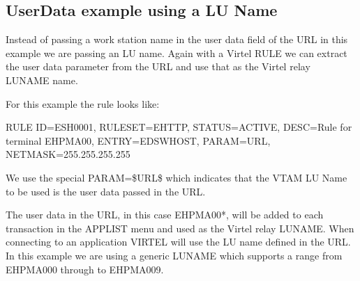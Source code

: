 \documentclass[letterpaper,10pt,english]{sphinxmanual}
\begin{document}
\ignorespaces 

\subsection{UserData example using a LU Name}
\label{\detokenize{connectivity_guide:userdata-example-using-a-lu-name}}\label{\detokenize{connectivity_guide:index-154}}
\sphinxAtStartPar
Instead of passing a work station name in the user data field of the URL in this example we are passing an LU name. Again with a Virtel RULE we can extract the user data parameter from the URL and use that as the Virtel relay LUNAME name.

\sphinxAtStartPar
{}

\sphinxAtStartPar
For this example the rule looks like:\sphinxhyphen{}

\begin{sphinxVerbatim}[commandchars=\\\{\}]
RULE ID=ESH0001,
RULESET=E\PYGZhy{}HTTP,
STATUS=ACTIVE,
DESC=\PYGZsq{}Rule for terminal EHPMA00\PYGZsq{},
ENTRY=EDSWHOST,
PARAM=\PYGZdl{}URL\PYGZdl{},
NETMASK=255.255.255.255
\end{sphinxVerbatim}

\sphinxAtStartPar
We use the special PARAM=\$URL\$ which indicates that the VTAM LU Name to be used is the user data passed in the URL.

\sphinxAtStartPar
{}

\sphinxAtStartPar
{}

\sphinxAtStartPar
The user data in the URL, in this case EHPMA00*, will be added to each transaction in the APPLIST menu and used as the Virtel relay LUNAME. When connecting to an application VIRTEL will use the LU name defined in the URL. In this example we are using a generic LUNAME which supports a range from EHPMA000 through to EHPMA009.

\ignorespaces 
\end{document}
